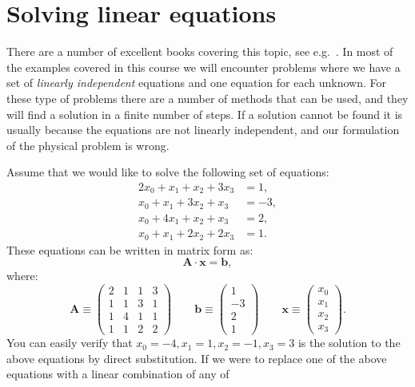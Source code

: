 \documentclass[graybox,sectrefs,envcountresetchap,open=right,final]{svmonodo}
\begin{document}
\section{Solving linear equations}
There are a number of excellent books covering this topic, see e.g.~\cite{press2007,trefethen1997,stoer2013,strang2019}.
In most of the examples covered in this course we will encounter problems where we have a set of \emph{linearly independent} equations and one equation for each unknown. For these type of problems there are a number of methods that can be used, and they will find a solution in a finite number of steps. If a solution cannot be found it is usually because the equations are not linearly independent, and our formulation of the physical problem is wrong.

Assume that we would like to solve the following set of equations:
\begin{align}
2x_0+x_1+x_2+3x_3&=1, \label{eq:lin:la} \\ 
x_0+x_1+3x_2+x_3&=-3, \label{eq:lin:lb} \\ 
x_0+4x_1+x_2+x_3&=2, \label{eq:lin:lc} \\ 
x_0+x_1+2x_2+2x_3&=1. \label{eq:lin:ld} 
\end{align}
These equations can be written in matrix form as:
\begin{equation}
\mathbf{A\cdot x}=\mathbf{b},
\label{eq:lin:mat}
\end{equation}
where:
\begin{equation}
\mathbf{A}\equiv\begin{pmatrix}
2&1&1&3\\ 
1&1&3&1\\ 
1&4&1&1\\ 
1&1&2&2
\end{pmatrix}
\qquad
\mathbf{b}\equiv
\begin{pmatrix}
1\\-3\\2\\1
\end{pmatrix}
\qquad
\mathbf{x}\equiv
\begin{pmatrix}
x_0\\x_1\\x_2\\x_3
\end{pmatrix}.
\label{eq:lin:matA}
\end{equation}
You can easily verify that $x_0=-4, x_1=1, x_2=-1, x_3= 3$ is the
solution to the above equations by direct substitution. If we were to
replace one of the above equations with a linear combination of any of
\end{document}
